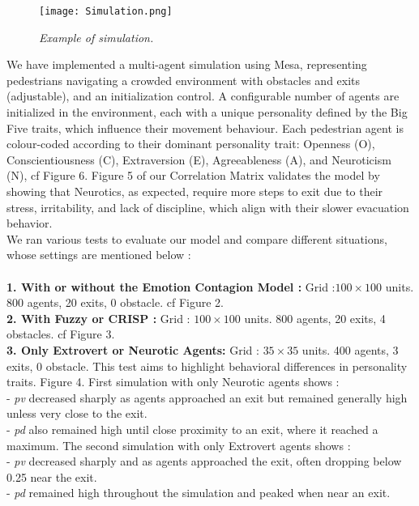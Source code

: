 \documentclass[12pt]{article}
\begin{document}
\begin{spacing}{1.15}
\begin{figure}[h!]
\end{figure}

\begin{multicols}{2}
\begin{figure}[H]
\centering
\texttt{[image: Simulation.png]}
\caption{\textit{Example of simulation.}}
\end{figure}
\noindent We have implemented a multi-agent simulation using Mesa, representing pedestrians navigating a crowded environment with obstacles and exits (adjustable), and an initialization control. A configurable number of agents are initialized in the environment, each with a unique personality defined by the Big Five traits, which influence their movement behaviour. Each pedestrian agent is colour-coded according to their dominant personality trait: Openness (O), Conscientiousness (C), Extraversion (E), Agreeableness (A), and Neuroticism (N), cf Figure 6. Figure 5 of our Correlation Matrix validates the model by showing that Neurotics, as expected, require more steps to exit due to their stress, irritability, and lack of discipline, which align with their slower evacuation behavior.\\
We ran various tests to evaluate our model and compare different situations, whose settings are mentioned below :\\
\\
\textbf{1. With or without the Emotion Contagion Model :}
Grid :$100 \times 100$ units. 800 agents, 20 exits, 0 obstacle. cf Figure 2.\\
\textbf{2. With Fuzzy or CRISP :}
Grid : $100 \times100$ units. 800 agents, 20 exits, 4 obstacles. cf Figure 3.\\
\textbf{3. Only Extrovert or Neurotic Agents:}
Grid : $35 \times35$ units. 400 agents, 3 exits, 0 obstacle. This test aims to highlight behavioral differences in personality traits. Figure 4. First simulation with only Neurotic agents shows :\\
- \textit{pv} decreased sharply as agents approached an exit but remained generally high unless very close to the exit.\\
- \textit{pd} also remained high until close proximity to an exit, where it reached a maximum.
The second simulation with only Extrovert agents shows :\\
- \textit{pv} decreased sharply and as agents approached the exit, often dropping below 0.25 near the exit.\\
- \textit{pd} remained high throughout the simulation and peaked when near an exit.\\


\end{multicols}
\end{spacing}
\end{document}

